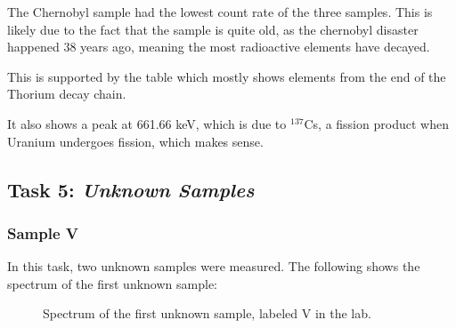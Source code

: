 \documentclass{article}
\begin{document}
The Chernobyl sample had the lowest count rate of the three samples. This is likely due to the fact that the sample is quite old, as the chernobyl disaster happened 38 years ago, meaning the most radioactive elements have decayed.

This is supported by the table which mostly shows elements from the end of the Thorium decay chain. 

It also shows a peak at 661.66 keV, which is due to $^{137}$Cs, a fission product when Uranium undergoes fission, which makes sense.

\pagebreak{}

\subsection{Task 5: \textit{Unknown Samples}}

\subsubsection{Sample V}

In this task, two unknown samples were measured. The following shows the spectrum of the first unknown sample:

\begin{figure}[h!]
	\centering
	\scalebox{1}{}
	\caption{Spectrum of the first unknown sample, labeled V in the lab.}
	\label{fig:V}
\end{figure}
\end{document}
